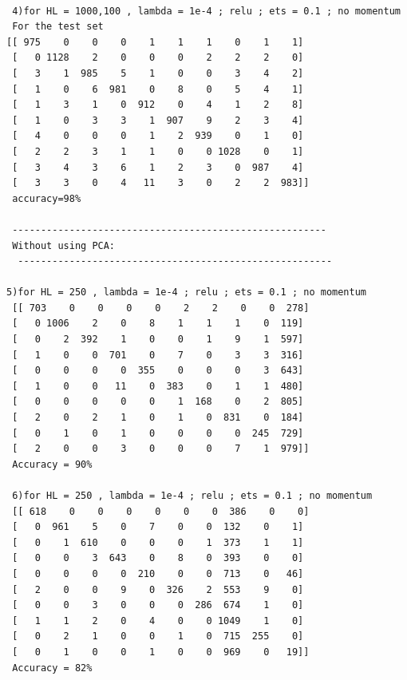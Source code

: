 \documentclass[conference]{IEEEtran}
\begin{document}
 \begin{verbatim}

 4)for HL = 1000,100 , lambda = 1e-4 ; relu ; ets = 0.1 ; no momentum
 For the test set
[[ 975    0    0    0    1    1    1    0    1    1]
 [   0 1128    2    0    0    0    2    2    2    0]
 [   3    1  985    5    1    0    0    3    4    2]
 [   1    0    6  981    0    8    0    5    4    1]
 [   1    3    1    0  912    0    4    1    2    8]
 [   1    0    3    3    1  907    9    2    3    4]
 [   4    0    0    0    1    2  939    0    1    0]
 [   2    2    3    1    1    0    0 1028    0    1]
 [   3    4    3    6    1    2    3    0  987    4]
 [   3    3    0    4   11    3    0    2    2  983]]
 accuracy=98%
 
 -------------------------------------------------------
 Without using PCA:
  -------------------------------------------------------
 
5)for HL = 250 , lambda = 1e-4 ; relu ; ets = 0.1 ; no momentum
 [[ 703    0    0    0    0    2    2    0    0  278]
 [   0 1006    2    0    8    1    1    1    0  119]
 [   0    2  392    1    0    0    1    9    1  597]
 [   1    0    0  701    0    7    0    3    3  316]
 [   0    0    0    0  355    0    0    0    3  643]
 [   1    0    0   11    0  383    0    1    1  480]
 [   0    0    0    0    0    1  168    0    2  805]
 [   2    0    2    1    0    1    0  831    0  184]
 [   0    1    0    1    0    0    0    0  245  729]
 [   2    0    0    3    0    0    0    7    1  979]]
 Accuracy = 90%
 
 6)for HL = 250 , lambda = 1e-4 ; relu ; ets = 0.1 ; no momentum
 [[ 618    0    0    0    0    0    0  386    0    0]
 [   0  961    5    0    7    0    0  132    0    1]
 [   0    1  610    0    0    0    1  373    1    1]
 [   0    0    3  643    0    8    0  393    0    0]
 [   0    0    0    0  210    0    0  713    0   46]
 [   2    0    0    9    0  326    2  553    9    0]
 [   0    0    3    0    0    0  286  674    1    0]
 [   1    1    2    0    4    0    0 1049    1    0]
 [   0    2    1    0    0    1    0  715  255    0]
 [   0    1    0    0    1    0    0  969    0   19]]
 Accuracy = 82%
 
 \end{verbatim}
 \newpage
\end{document}
